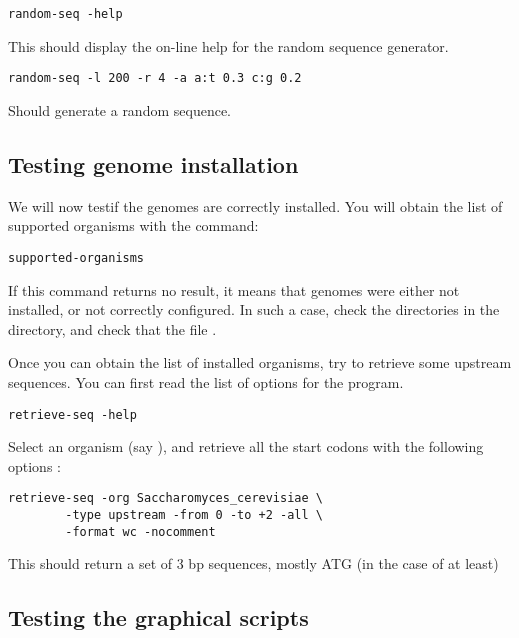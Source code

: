 \documentclass{article}
\begin{document}
\begin{verbatim}
random-seq -help
\end{verbatim}

This should display the on-line help for the random sequence
generator. 

\begin{verbatim}
random-seq -l 200 -r 4 -a a:t 0.3 c:g 0.2
\end{verbatim}

Should generate a random sequence.

\subsection{Testing genome installation}

We will now testif the genomes are correctly installed. You will
obtain the list of supported organisms with the command:

\begin{verbatim}
supported-organisms
\end{verbatim}

If this command returns no result, it means that genomes were either
not installed, or not correctly configured. In such a case, check the
directories in the  directory, and check that the
file .

Once you can obtain the list of installed organisms, try to retrieve
some upstream sequences. You can first read the list of options for the
 program.

\begin{verbatim}
retrieve-seq -help
\end{verbatim}

Select an organism (say ), and
retrieve all the start codons with the following options :

\begin{verbatim}
retrieve-seq -org Saccharomyces_cerevisiae \
        -type upstream -from 0 -to +2 -all \
        -format wc -nocomment 
\end{verbatim}

This should return a set of 3 bp sequences, mostly ATG (in the case of
 at least)

\subsection{Testing the graphical scripts}
\end{document}
